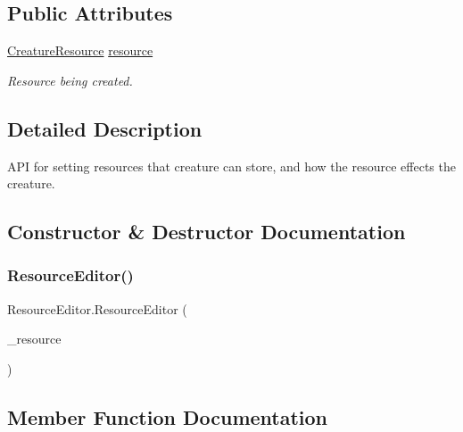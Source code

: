 \subsection*{Public Attributes}
\begin{DoxyCompactItemize}
\item 
\mbox{\hyperlink{class_creature_resource}{Creature\+Resource}} \mbox{\hyperlink{class_resource_editor_a523c5ec92b05df42505540a92df1e441}{resource}}
\begin{DoxyCompactList}\small\item\em Resource being created. \end{DoxyCompactList}\end{DoxyCompactItemize}


\subsection{Detailed Description}
A\+PI for setting resources that creature can store, and how the resource effects the creature. 



\subsection{Constructor \& Destructor Documentation}
\mbox{\label{class_resource_editor_a928faf6be8a59c7145e47948bcfeeeb2}} 
\subsubsection{\texorpdfstring{Resource\+Editor()}{ResourceEditor()}}
{\footnotesize\ttfamily Resource\+Editor.\+Resource\+Editor (\begin{DoxyParamCaption}\item[{\mbox{\hyperlink{class_creature_resource}{Creature\+Resource}}}]{\+\_\+resource }\end{DoxyParamCaption})}



\subsection{Member Function Documentation}
\mbox{\label{class_resource_editor_afcd49279ce6e7d4c886dea66fcbe6d55}} 

